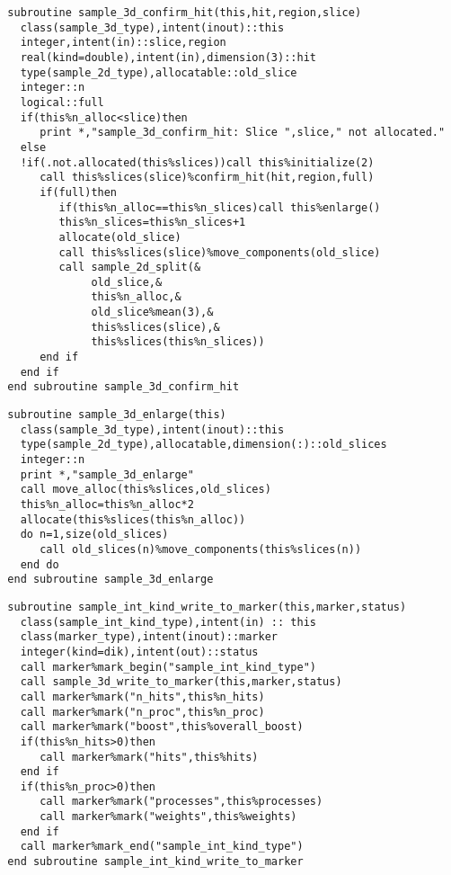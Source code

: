 \begin{Verbatim}
  subroutine sample_3d_confirm_hit(this,hit,region,slice)
    class(sample_3d_type),intent(inout)::this
    integer,intent(in)::slice,region
    real(kind=double),intent(in),dimension(3)::hit
    type(sample_2d_type),allocatable::old_slice
    integer::n
    logical::full
    if(this%n_alloc<slice)then
       print *,"sample_3d_confirm_hit: Slice ",slice," not allocated."
    else
    !if(.not.allocated(this%slices))call this%initialize(2)
       call this%slices(slice)%confirm_hit(hit,region,full)
       if(full)then
          if(this%n_alloc==this%n_slices)call this%enlarge()
          this%n_slices=this%n_slices+1
          allocate(old_slice)
          call this%slices(slice)%move_components(old_slice)
          call sample_2d_split(&
               old_slice,&
               this%n_alloc,&
               old_slice%mean(3),&
               this%slices(slice),&
               this%slices(this%n_slices))
       end if
    end if
  end subroutine sample_3d_confirm_hit
\end{Verbatim}

\begin{Verbatim}
  subroutine sample_3d_enlarge(this)
    class(sample_3d_type),intent(inout)::this
    type(sample_2d_type),allocatable,dimension(:)::old_slices
    integer::n
    print *,"sample_3d_enlarge"
    call move_alloc(this%slices,old_slices)
    this%n_alloc=this%n_alloc*2
    allocate(this%slices(this%n_alloc))
    do n=1,size(old_slices)
       call old_slices(n)%move_components(this%slices(n))
    end do
  end subroutine sample_3d_enlarge
\end{Verbatim}

\begin{Verbatim}
  subroutine sample_int_kind_write_to_marker(this,marker,status)
    class(sample_int_kind_type),intent(in) :: this
    class(marker_type),intent(inout)::marker
    integer(kind=dik),intent(out)::status
    call marker%mark_begin("sample_int_kind_type")
    call sample_3d_write_to_marker(this,marker,status)
    call marker%mark("n_hits",this%n_hits)
    call marker%mark("n_proc",this%n_proc)
    call marker%mark("boost",this%overall_boost)
    if(this%n_hits>0)then
       call marker%mark("hits",this%hits)
    end if
    if(this%n_proc>0)then
       call marker%mark("processes",this%processes)
       call marker%mark("weights",this%weights)
    end if
    call marker%mark_end("sample_int_kind_type")
  end subroutine sample_int_kind_write_to_marker
\end{Verbatim}

